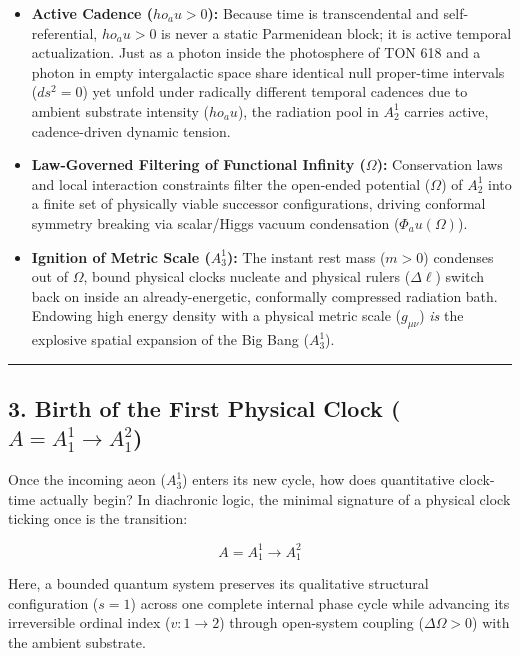 \documentclass[
]{article}
\providecommand{\tightlist}{%
  \setlength{\itemsep}{0pt}\setlength{\parskip}{0pt}}
\begin{document}
\begin{itemize}
\tightlist
\item
  \textbf{Active Cadence (\(ho_    au > 0\)):} Because time is
  transcendental and self-referential, \(ho_   au > 0\) is never a
  static Parmenidean block; it is active temporal actualization. Just as
  a photon inside the photosphere of TON 618 and a photon in empty
  intergalactic space share identical null proper-time intervals
  (\(ds^2 = 0\)) yet unfold under radically different temporal cadences
  due to ambient substrate intensity (\(ho_  au\)), the radiation pool
  in \(A_2^1\) carries active, cadence-driven dynamic tension.
\item
  \textbf{Law-Governed Filtering of Functional Infinity (\(\Omega\)):}
  Conservation laws and local interaction constraints filter the
  open-ended potential (\(\Omega\)) of \(A_2^1\) into a finite set of
  physically viable successor configurations, driving conformal symmetry
  breaking via scalar/Higgs vacuum condensation (\(\Phi_ au(\Omega)\)).
\item
  \textbf{Ignition of Metric Scale (\(A_3^1\)):} The instant rest mass
  (\(m > 0\)) condenses out of \(\Omega\), bound physical clocks
  nucleate and physical rulers (\(\Delta\ell\)) switch back on inside an
  already-energetic, conformally compressed radiation bath. Endowing
  high energy density with a physical metric scale (\(g_{\mu\nu}\))
  \emph{is} the explosive spatial expansion of the Big Bang (\(A_3^1\)).
\end{itemize}

\begin{center}\rule{0.5\linewidth}{0.5pt}\end{center}

\subsection{\texorpdfstring{3. Birth of the First Physical Clock
(\(A = A_1^1 \to A_1^2\))}{3. Birth of the First Physical Clock (A = A\_1\^{}1 \textbackslash to A\_1\^{}2)}}\label{birth-of-the-first-physical-clock-a-a_11-to-a_12}

Once the incoming aeon (\(A_3^1\)) enters its new cycle, how does
quantitative clock-time actually begin? In diachronic logic, the minimal
signature of a physical clock ticking once is the transition:

\[A = A_1^1 \longrightarrow A_1^2\]

Here, a bounded quantum system preserves its qualitative structural
configuration (\(s = 1\)) across one complete internal phase cycle while
advancing its irreversible ordinal index (\(v: 1 \to 2\)) through
open-system coupling (\(\Delta\Omega > 0\)) with the ambient substrate.
\end{document}
